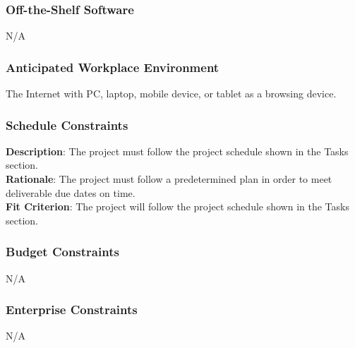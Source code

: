 \documentclass[11pt]{article}
\begin{document}
\subsubsection{Off-the-Shelf Software}
N/A

\subsubsection{Anticipated Workplace Environment}
The Internet with PC, laptop, mobile device, or tablet as a browsing device.

\subsubsection{Schedule Constraints}
\textbf{Description}: The project must follow the project schedule shown in the Tasks section.
\\
\textbf{Rationale}: The project must follow a predetermined plan in order to meet deliverable due dates on time.
\\
\textbf{Fit Criterion}: The project will follow the project schedule shown in the Tasks section.

\subsubsection{Budget Constraints}
N/A

\subsubsection{Enterprise Constraints}
N/A
\end{document}
